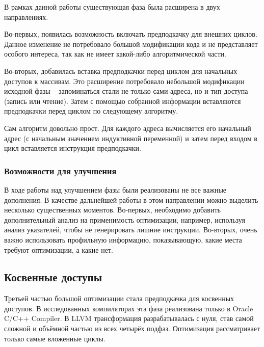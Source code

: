 \documentclass[12pt,a4paper]{article}
\begin{document}
\indent

В рамках данной работы существующая фаза была расширена в двух направлениях.

Во-первых, появилась возможность включать предподкачку для внешних циклов. Данное изменение не потребовало большой модификации кода и не представляет особого интереса, так как не имеет какой-либо алгоритмической части.

Во-вторых, добавилась вставка предподкачки перед циклом для начальных доступов к массивам. Это расширение потребовало небольшой модификации исходной фазы -- запоминаться стали не только сами адреса, но и тип доступа (запись или чтение). Затем с помощью собранной информации вставляются предподкачки перед циклом по следующему алгоритму.



Сам алгоритм довольно прост. Для каждого адреса вычисляется его начальный адрес (с начальным значением индуктивной переменной) и затем перед входом в цикл вставляется инструкция предподкачки.

\subsubsection{Возможности для улучшения}

\indent

В ходе работы над улучшением фазы были реализованы не все важные дополнения. В качестве дальнейшей работы в этом направлении можно выделить несколько существенных моментов. Во-первых, необходимо добавить дополнительный анализ на применимость оптимизации, например, используя анализ указателей, чтобы не генерировать лишние инструкции. Во-вторых, очень важно использовать профильную информацию, показывающую, какие места требуют оптимизации, а какие нет.

\subsection{Косвенные доступы}

\indent

Третьей частью большой оптимизации стала предподкачка для косвенных доступов. В исследованных компиляторах эта фаза реализована только в Oracle C/C++ Compiler. В LLVM трансформация разрабатывалась с нуля, став самой сложной и объёмной частью из всех четырёх подфаз. Оптимизация рассматривает только самые вложенные циклы.
\end{document}
